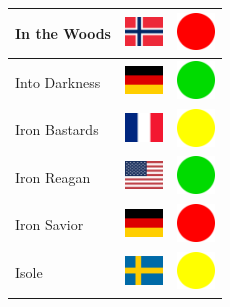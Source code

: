 \documentclass[12pt, a4paper, twoside]{report}
\begin{document}
\begin{center}
\begin{longtable}{|p{5cm}|p{2cm}|p{2cm}|}
In the Woods & \includegraphics[width=1cm]{4x3/no} & \includegraphics[width=1cm]{likes/n} \\ \hline
Into Darkness & \includegraphics[width=1cm]{4x3/de} & \includegraphics[width=1cm]{likes/y} \\ \hline
Iron Bastards & \includegraphics[width=1cm]{4x3/fr} & \includegraphics[width=1cm]{likes/m} \\ \hline
Iron Reagan & \includegraphics[width=1cm]{4x3/us} & \includegraphics[width=1cm]{likes/y} \\ \hline
Iron Savior & \includegraphics[width=1cm]{4x3/de} & \includegraphics[width=1cm]{likes/n} \\ \hline
Isole & \includegraphics[width=1cm]{4x3/se} & \includegraphics[width=1cm]{likes/m} \\ \hline

\end{longtable}
\end{center}
\end{document}
